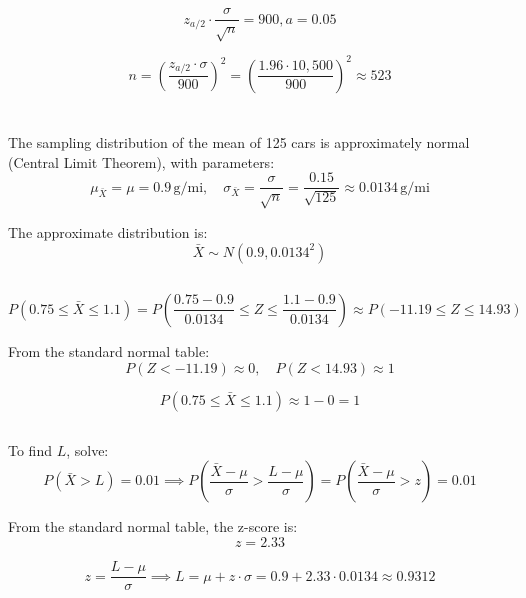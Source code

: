 \documentclass{homework}
\begin{document}
\subsection{}

\[
z_{a/2} \cdot \frac{\sigma}{\sqrt{n}} = 900, a = 0.05
\]

\[
n = \left(\frac{z_{a/2} \cdot \sigma}{900}\right)^2 = \left(\frac{1.96 \cdot 10,500}{900}\right)^2 \approx 523
\]

\section{}

\subsection{}

The sampling distribution of the mean of 125 cars is approximately normal (Central Limit Theorem), with parameters:
\[
\mu_{\bar{X}} = \mu = 0.9 \, \mathrm{g/mi}, \quad \sigma_{\bar{X}} = \frac{\sigma}{\sqrt{n}} = \frac{0.15}{\sqrt{125}} \approx 0.0134 \, \mathrm{g/mi}
\]

The approximate distribution is:
\[
\bar{X} \sim N(0.9, 0.0134^2)
\]

\subsection{}

\[
P(0.75 \leq \bar{X} \leq 1.1) = P\left(\frac{0.75 - 0.9}{0.0134} \leq Z \leq \frac{1.1 - 0.9}{0.0134}\right) \approx P(-11.19 \leq Z \leq 14.93)
\]

From the standard normal table:
\[
P(Z < -11.19) \approx 0,\quad P(Z < 14.93) \approx 1
\]

\[
P(0.75 \leq \bar{X} \leq 1.1) \approx 1 - 0 = 1
\]

\subsection{}

To find \(L\), solve:
\[
P(\bar{X} > L) = 0.01 \implies P(\frac{\bar{X} - \mu}{\sigma} > \frac{L - \mu}{\sigma}) = P(\frac{\bar{X} - \mu}{\sigma} > z) = 0.01
\]

From the standard normal table, the z-score is:
\[
z = 2.33
\]

\[
z = \frac{L - \mu}{\sigma} \implies L = \mu + z \cdot \sigma = 0.9 + 2.33 \cdot 0.0134 \approx 0.9312
\]
\end{document}
